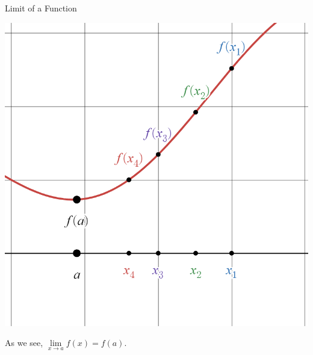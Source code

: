 \documentclass{beamer}
\begin{document}
\begin{frame}{Limit of a Function}

      \begin{center}

    \includegraphics[height=0.75\textheight, keepaspectratio]{cont4.png}
  \end{center}

{\color{white} As we see, $\lim\limits_{x\to a} f(x) = f(a)$.}

\end{frame}
\end{document}
